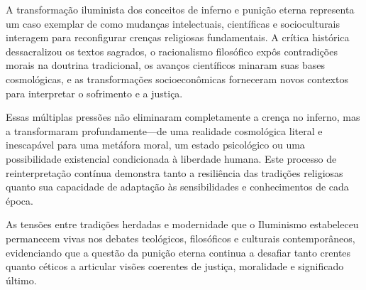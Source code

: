 A transformação iluminista dos conceitos de inferno e punição eterna representa um caso exemplar de como mudanças intelectuais, científicas e socioculturais interagem para reconfigurar crenças religiosas fundamentais. A crítica histórica dessacralizou os textos sagrados, o racionalismo filosófico expôs contradições morais na doutrina tradicional, os avanços científicos minaram suas bases cosmológicas, e as transformações socioeconômicas forneceram novos contextos para interpretar o sofrimento e a justiça.

Essas múltiplas pressões não eliminaram completamente a crença no inferno, mas a transformaram profundamente---de uma realidade cosmológica literal e inescapável para uma metáfora moral, um estado psicológico ou uma possibilidade existencial condicionada à liberdade humana. Este processo de reinterpretação contínua demonstra tanto a resiliência das tradições religiosas quanto sua capacidade de adaptação às sensibilidades e conhecimentos de cada época.

As tensões entre tradições herdadas e modernidade que o Iluminismo estabeleceu permanecem vivas nos debates teológicos, filosóficos e culturais contemporâneos, evidenciando que a questão da punição eterna continua a desafiar tanto crentes quanto céticos a articular visões coerentes de justiça, moralidade e significado último.
